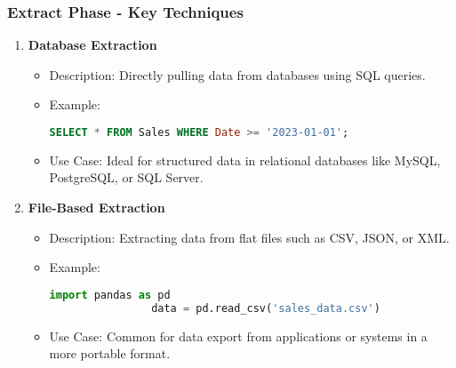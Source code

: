 \documentclass[aspectratio=169]{beamer}
\begin{document}
\begin{frame}[fragile]
    \frametitle{Extract Phase - Key Techniques}
    \begin{enumerate}
        \item \textbf{Database Extraction}
            \begin{itemize}
                \item Description: Directly pulling data from databases using SQL queries.
                \item Example: 
                \begin{lstlisting}[language=SQL]
                SELECT * FROM Sales WHERE Date >= '2023-01-01';
                \end{lstlisting}
                \item Use Case: Ideal for structured data in relational databases like MySQL, PostgreSQL, or SQL Server.
            \end{itemize}

        \item \textbf{File-Based Extraction}
            \begin{itemize}
                \item Description: Extracting data from flat files such as CSV, JSON, or XML.
                \item Example: 
                \begin{lstlisting}[language=Python]
                import pandas as pd
                data = pd.read_csv('sales_data.csv')
                \end{lstlisting}
                \item Use Case: Common for data export from applications or systems in a more portable format.
            \end{itemize}
    \end{enumerate}
\end{frame}
\end{document}
